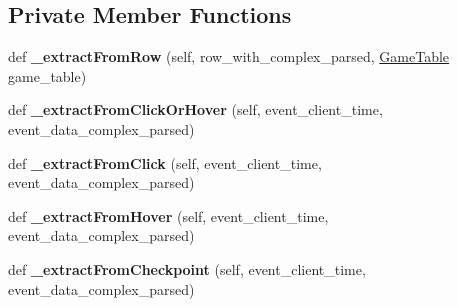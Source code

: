 \subsection*{Private Member Functions}
\begin{DoxyCompactItemize}
\item 
\mbox{\label{classfeature__extractors_1_1_jowilder_extractor_1_1_jowilder_extractor_a86af010bb927a663c9c0dea694928b3e}} 
def {\bfseries \+\_\+extract\+From\+Row} (self, row\+\_\+with\+\_\+complex\+\_\+parsed, \mbox{\hyperlink{class_game_table_1_1_game_table}{Game\+Table}} game\+\_\+table)
\item 
\mbox{\label{classfeature__extractors_1_1_jowilder_extractor_1_1_jowilder_extractor_ad6d3c04e3f40c6c2fd5600072b979ea8}} 
def {\bfseries \+\_\+extract\+From\+Click\+Or\+Hover} (self, event\+\_\+client\+\_\+time, event\+\_\+data\+\_\+complex\+\_\+parsed)
\item 
\mbox{\label{classfeature__extractors_1_1_jowilder_extractor_1_1_jowilder_extractor_ae5bbb14963f8a8a89037925d58d68f77}} 
def {\bfseries \+\_\+extract\+From\+Click} (self, event\+\_\+client\+\_\+time, event\+\_\+data\+\_\+complex\+\_\+parsed)
\item 
\mbox{\label{classfeature__extractors_1_1_jowilder_extractor_1_1_jowilder_extractor_a870c5238391a8d904b5647b15df2198d}} 
def {\bfseries \+\_\+extract\+From\+Hover} (self, event\+\_\+client\+\_\+time, event\+\_\+data\+\_\+complex\+\_\+parsed)
\item 
\mbox{\label{classfeature__extractors_1_1_jowilder_extractor_1_1_jowilder_extractor_ae5c7059e8a0f2fd8790c322f40f6a308}} 
def {\bfseries \+\_\+extract\+From\+Checkpoint} (self, event\+\_\+client\+\_\+time, event\+\_\+data\+\_\+complex\+\_\+parsed)
\item 
\mbox{\label{classfeature__extractors_1_1_jowilder_extractor_1_1_jowilder_extractor_ac8951c8b30ddd9bfec680c1ca03ff256}} 

\end{DoxyCompactItemize}
